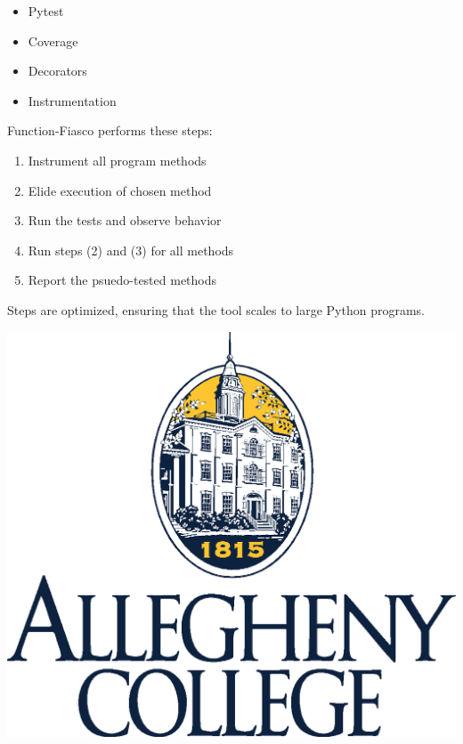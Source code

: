 \documentclass[a0paper,fleqn]{betterposter}
\begin{document}
{  \begin{itemize}

    \item Pytest
    \item Coverage
    \item Decorators
    \item Instrumentation

  \end{itemize}

  \vspace*{.5in}
  Function-Fiasco performs these steps:

  \begin{enumerate}[leftmargin=.5in]

    \item Instrument all program methods
    \item Elide execution of chosen method
    \item Run the tests and observe behavior
    \item Run steps (2) and (3) for all methods
    \item Report the psuedo-tested methods

  \end{enumerate}

  \vspace*{.25in}
  Steps are optimized, ensuring that the tool scales to large Python programs.
  \vspace*{.5in}

  \vfill

  \includegraphics[width=\textwidth]{img/CollegeLogo.eps}\\

}
\end{document}
